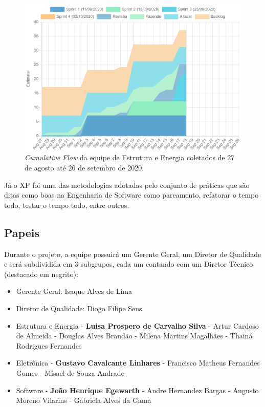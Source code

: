 \begin{figure}[H]
\centering
  \includegraphics[scale=0.3]{figuras/cumulative_estrutura.png}
  \caption{\textit{Cumulative Flow} da equipe de Estrutura e Energia coletados de 27 de agosto até 26 de setembro de 2020.}
  \label{fig:cumulativeestrutura}
\end{figure}

Já o XP foi uma das metodologias adotadas pelo conjunto de práticas que são ditas como boas na Engenharia de Software como pareamento, refatorar o tempo todo, testar o tempo todo, entre outros.

\subsection{Papeis}
Durante o projeto, a equipe possuirá um Gerente Geral, um Diretor de Qualidade e será subdividida em 3 subgrupos, cada um contando com um Diretor Técnico (destacado em negrito):
\begin{itemize}
    \item Gerente Geral: Isaque Alves de Lima
    \item Diretor de Qualidade: Diogo Filipe Sens
    \item Estrutura e Energia
        \subitem - \textbf{Luisa Prospero de Carvalho Silva}
        \subitem - Artur Cardoso de Almeida
        \subitem - Douglas Alves Brandão 
        \subitem - Milena Martins Magalhães
        \subitem - Thainá Rodrigues Fernandes
    \item Eletrônica
        \subitem - \textbf{Gustavo Cavalcante Linhares}
        \subitem - Francisco Matheus Fernandes Gomes 
        \subitem - Misael de Souza Andrade
    \item Software
        \subitem - \textbf{João Henrique Egewarth}  
        \subitem - Andre Hernandez Bargas
        \subitem - Augusto Moreno Vilarins
        \subitem - Gabriela Alves da Gama
\end{itemize}

